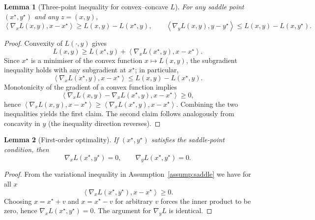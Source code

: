 \documentclass{article}
\newtheorem{lemma}{Lemma}
\newcommand{\inner}[2]{\left\langle #1,#2\right\rangle}
\begin{document}
\begin{lemma}[Three‑point inequality for convex–concave $L$]\label{lem:threepoint}
For any saddle point $(x^{\star},y^{\star})$ and any $z=(x,y)$,
\[
\inner{\nabla_x L(x,y)}{x-x^{\star}} \ge L(x,y)-L(x^{\star},y),\qquad
\inner{\nabla_y L(x,y)}{y-y^{\star}} \le L(x,y)-L(x,y^{\star}).
\tag{2}
\]
\end{lemma}
\begin{proof}
Convexity of $L(\cdot ,y)$ gives
\[
L(x,y)\ge L(x^{\star},y)+\inner{\nabla_x L(x^{\star},y)}{x-x^{\star}} .
\]
Since $x^{\star}$ is a minimiser of the convex function $x\mapsto L(x,y)$, the subgradient inequality holds with any subgradient at $x^{\star}$; in particular,
\[
\inner{\nabla_x L(x^{\star},y)}{x-x^{\star}}\le L(x,y)-L(x^{\star},y).
\]
Monotonicity of the gradient of a convex function implies
\[
\inner{\nabla_x L(x,y)-\nabla_x L(x^{\star},y)}{x-x^{\star}}\ge 0,
\]
hence $\inner{\nabla_x L(x,y)}{x-x^{\star}}\ge\inner{\nabla_x L(x^{\star},y)}{x-x^{\star}}$.
Combining the two inequalities yields the first claim.
The second claim follows analogously from concavity in $y$ (the inequality direction reverses). 
\end{proof}

\begin{lemma}[First‑order optimality]\label{lem:firstorder}
If $(x^{\star},y^{\star})$ satisfies the saddle‑point condition, then
\[
\nabla_x L(x^{\star},y^{\star})=0,\qquad \nabla_y L(x^{\star},y^{\star})=0 .
\]
\end{lemma}
\begin{proof}
From the variational inequality in Assumption~\ref{assump:saddle} we have for all $x$
\[
\inner{\nabla_x L(x^{\star},y^{\star})}{x-x^{\star}}\ge 0 .
\]
Choosing $x=x^{\star}+v$ and $x=x^{\star}-v$ for arbitrary $v$ forces the inner product to be zero, hence $\nabla_x L(x^{\star},y^{\star})=0$. The argument for $\nabla_y L$ is identical. 
\end{proof}
\end{document}
